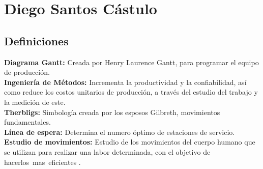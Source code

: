 \section{Diego Santos Cástulo}
\subsection{Definiciones}
\textbf{Diagrama Gantt:} Creada por Henry Laurence Gantt, para programar el equipo de producción.
\\
\textbf{Ingeniería de Métodos:} Incrementa la productividad y la confiabilidad, así como reduce los costos unitarios de producción, a través del estudio del trabajo y la medición de este.
\\
\textbf{Therbligs:} Simbología creada por los esposos Gilbreth, movimientos fundamentales.
\\
\textbf{Línea de espera:} Determina el numero óptimo de estaciones de servicio.
\\
\textbf{Estudio de movimientos:} Estudio de los movimientos del cuerpo humano que se utilizan para realizar una labor determinada, con el objetivo de hacerlos mas eficientes \cite{RAE}.



